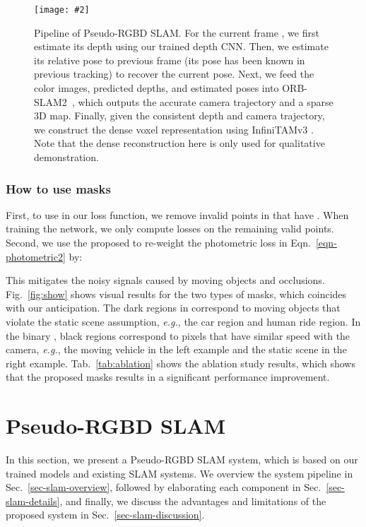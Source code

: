 \documentclass[twocolumn]{svjour3}
\renewcommand{\cite}[1]{\textcolor{blue}{\citep{#1}}}
\def\eg{\emph{e.g.}}
\newcommand{\figref}[1]{Fig.~\ref{#1}}
\newcommand{\tabref}[1]{Tab.~\ref{#1}}
\newcommand{\equref}[1]{Eqn.~\ref{#1}}
\newcommand{\secref}[1]{Sec.~\ref{#1}}
\newcommand{\addImg}[2][0.495]{\texttt{[image: \#2]}}
\begin{document}
\begin{figure*}[t]
  \centering
  \addImg[1]{p-slam-figure.pdf}
  \caption{Pipeline of Pseudo-RGBD SLAM. 
  For the current frame , 
  we first estimate its depth  using our trained depth CNN.
  Then, we estimate its relative pose to previous frame  (its pose 
   has been known in previous tracking) to recover the current pose.
Next, we feed the color images, predicted depths, and estimated poses into ORB-SLAM2~\cite{murORB2},
  which outputs the accurate camera trajectory and a sparse 3D map. 
Finally, given the consistent depth and camera trajectory, 
  we construct the dense voxel representation using InfiniTAMv3
  \cite{InfiniTAM_V3_Report_2017}.
Note that the dense reconstruction here is only used for qualitative demonstration.
  }\label{fig:p-slam}
\end{figure*}

\subsubsection{How to use masks}\label{sec-use-mask}

First, to use  in our loss function, 
we remove invalid points in  that have .
When training the network, we only compute losses on the remaining valid points.
Second, we use the proposed  to re-weight the photometric loss 
in \equref{eqn-photometric2} by:

This mitigates the noisy signals caused by moving objects and occlusions.
\figref{fig:show} shows visual results for the two types of masks, 
which coincides with our anticipation.
The dark regions in  correspond to moving objects that 
violate the static scene assumption, 
\eg, the car region and human ride region.
In the binary , black regions correspond to pixels that have similar speed with the camera,
\eg, the moving vehicle in the left example and the static scene in the right 
example.
\tabref{tab:ablation} shows the ablation study results, which shows that the proposed masks results in a significant performance improvement.



\section{Pseudo-RGBD SLAM}\label{sec-slam}

In this section, we present a Pseudo-RGBD SLAM system,
which is based on our trained models and existing SLAM systems.
We overview the system pipeline in \secref{sec-slam-overview},
followed by elaborating each component in \secref{sec-slam-details},
and finally, we discuss the advantages and limitations of the proposed system in \secref{sec-slam-discussion}.
\end{document}
